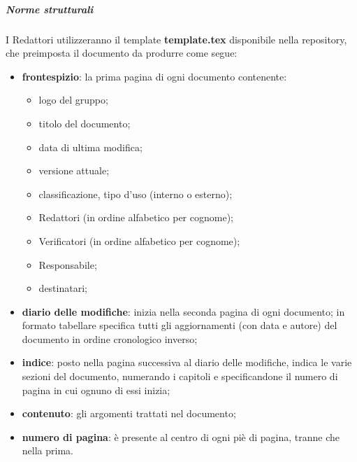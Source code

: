 		\subparagraph{Norme strutturali}
		I Redattori utilizzeranno il template \textbf{template.tex} disponibile nella repository, che preimposta il documento da produrre come segue:
		\begin{itemize}
			\item \textbf{frontespizio}: la prima pagina di ogni documento contenente:
			\begin{itemize}
				\item logo del gruppo;
				\item titolo del documento;
				\item data di ultima modifica;
				\item versione attuale;
				\item classificazione, tipo d'uso (interno o esterno);
				\item Redattori (in ordine alfabetico per cognome);
				\item Verificatori (in ordine alfabetico per cognome);
				\item Responsabile;
				\item destinatari;
			\end{itemize}
			\item \textbf{diario delle modifiche}: inizia nella seconda pagina di ogni documento; in formato tabellare specifica tutti gli aggiornamenti (con data e autore) del documento in ordine cronologico inverso;
			\item \textbf{indice}: posto nella pagina successiva al diario delle modifiche, indica le varie sezioni del documento, numerando i capitoli e specificandone il numero di pagina in cui ognuno di essi inizia;
			\item \textbf{contenuto}: gli argomenti trattati nel documento;
			\item \textbf{numero di pagina}: è presente al centro di ogni piè di pagina, tranne che nella prima.
		\end{itemize}

